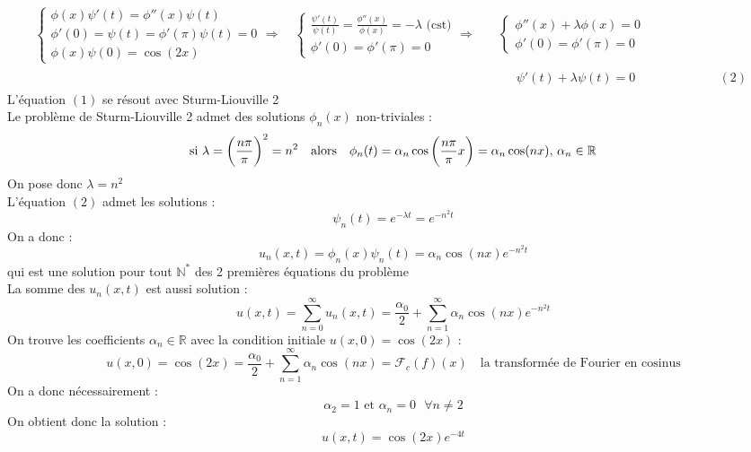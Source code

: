 \begin{align*}
    \begin{cases}
        \phi(x)\psi'(t) = \phi''(x)\psi(t) \\
        \phi'(0) = \psi(t) = \phi'(\pi)\psi(t) = 0 \\
        \phi(x)\psi(0) = \cos(2x)
    \end{cases}
    \Rightarrow \quad
    \begin{cases}
        \frac{\psi'(t)}{\psi(t)} = \frac{\phi''(x)}{\phi(x)} = -\lambda \text{ (cst)} \\
        \phi'(0) = \phi'(\pi) = 0
    \end{cases}
    \Rightarrow \quad
    &\begin{cases}
            \phi''(x) + \lambda \phi(x) = 0 \tag{1} \\
            \phi'(0) = \phi'(\pi) = 0
    \end{cases} \\
    &\begin{aligned}
        \quad \psi'(t) + \lambda \psi(t) = 0 \qquad \qquad \qquad \text{ }(2)
    \end{aligned}
\end{align*}
L'équation $(1)$ se résout avec Sturm-Liouville 2 \\
Le problème de Sturm-Liouville 2 admet des solutions $\phi_n(x)$ non-triviales : \\
$$\text{si } \lambda = \bigg{(} \frac{n\pi}{\pi} \bigg{)}^2 = n^2 \quad \text{alors} \quad \phi_n(t) = \alpha_n \cos \bigg{(} \frac{n\pi}{\pi}x \bigg{)} = \alpha_n \cos(nx) \text{, } \alpha_n \in \mathbb{R}$$
On pose donc $\lambda = n^2$ \\
L'équation $(2)$ admet les solutions :
$$\psi_n(t) = e^{-\lambda t} = e^{-n^2t}$$
On a donc :
$$u_n(x,t) = \phi_n(x)\psi_n(t) = \alpha_n\cos(nx)e^{-n^2t}$$
qui est une solution pour tout $\mathbb{N}^*$ des 2 premières équations du problème \\
La somme des $u_n(x,t)$ est aussi solution :
$$u(x,t) = \sum_{n=0}^{\infty} u_n(x,t) = \frac{\alpha_0}{2} + \sum_{n=1}^{\infty} \alpha_n \cos(nx)e^{-n^2t}$$
On trouve les coefficients $\alpha_n \in \mathbb{R}$ avec la condition initiale $u(x,0) = \cos(2x)$ :
$$u(x,0) = \cos(2x) = \frac{\alpha_0}{2} + \sum_{n=1}^{\infty} \alpha_n \cos(nx) = \mathcal{F}_c(f)(x) \quad \text{la transformée de Fourier en cosinus}$$
On a donc nécessairement :
$$\alpha_2 = 1 \text{ et } \alpha_n = 0 \text{ } \forall n \neq 2$$
On obtient donc la solution :
$$u(x,t) = \cos(2x) e^{-4t}$$
